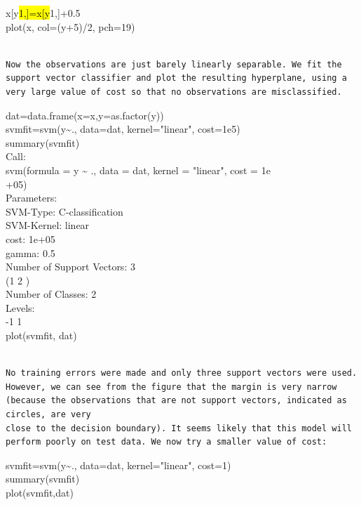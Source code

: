\documentclass[10pt]{article}
\begin{document}
\begin{displayquote}
x[y\hl{1,]=x[y}1,]+0.5\\
plot(x, col=(y+5)/2, pch=19)
\end{displayquote}

\begin{verbatim}

Now the observations are just barely linearly separable. We fit the support vector classifier and plot the resulting hyperplane, using a very large value of cost so that no observations are misclassified.
\end{verbatim}

\begin{displayquote}
dat=data.frame(x=x,y=as.factor(y))\\
svmfit=svm(y\~{}., data=dat, kernel="linear", cost=1e5)\\
summary(svmfit)\\
Call:\\
svm(formula = y \~{} ., data = dat, kernel = "linear", cost = 1e\\
+05)\\
Parameters:\\
SVM-Type: C-classification\\
SVM-Kernel: linear\\
cost: 1e+05\\
gamma: 0.5\\
Number of Support Vectors: 3\\
(1 2 )\\
Number of Classes: 2\\
Levels:\\
-1 1\\
plot(svmfit, dat)
\end{displayquote}

\begin{verbatim}

No training errors were made and only three support vectors were used. However, we can see from the figure that the margin is very narrow (because the observations that are not support vectors, indicated as circles, are very
close to the decision boundary). It seems likely that this model will perform poorly on test data. We now try a smaller value of cost:
\end{verbatim}

\begin{displayquote}
svmfit=svm(y\~{}., data=dat, kernel="linear", cost=1)\\
summary(svmfit)\\
plot(svmfit,dat)
\end{displayquote}
\end{document}
